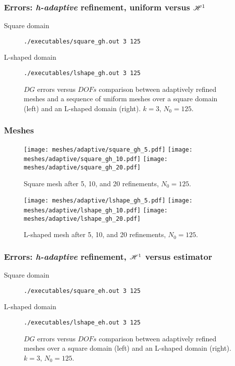 \begin{frame}[fragile]
    \frametitle{Errors: \textit{h-adaptive} refinement, uniform versus $\mathscr{H}^1$}

    \begin{description}
        \item[Square domain] \lstinline{./executables/square_gh.out 3 125}
        \item[L-shaped domain] \lstinline{./executables/lshape_gh.out 3 125}
    \end{description}

    \begin{figure}[!ht]
        
        \caption{$DG$ errors versus $DOFs$ comparison between adaptively refined meshes and a sequence of uniform meshes over a square domain (left) and an L-shaped domain (right). $k = 3$, $N_0 = 125$.}
    \end{figure}
\end{frame}

\begin{frame}
    \frametitle{Meshes}

\begin{figure}[!ht]
    \centering
    \texttt{[image: meshes/adaptive/square\_gh\_5.pdf]}
    \texttt{[image: meshes/adaptive/square\_gh\_10.pdf]}
    \texttt{[image: meshes/adaptive/square\_gh\_20.pdf]}
    \caption{Square mesh after 5, 10, and 20 refinements, $N_0 = 125$.}
\end{figure}

\begin{figure}[!ht]
    \centering
    \texttt{[image: meshes/adaptive/lshape\_gh\_5.pdf]}
    \texttt{[image: meshes/adaptive/lshape\_gh\_10.pdf]}
    \texttt{[image: meshes/adaptive/lshape\_gh\_20.pdf]}
    \caption{L-shaped mesh after 5, 10, and 20 refinements, $N_0 = 125$.}
\end{figure}
\end{frame}

\begin{frame}[fragile]
    \frametitle{Errors: \textit{h-adaptive} refinement, $\mathscr{H}^1$ versus estimator}

    \begin{description}
        \item[Square domain] \lstinline{./executables/square_eh.out 3 125}
        \item[L-shaped domain] \lstinline{./executables/lshape_eh.out 3 125}
    \end{description}

    \begin{figure}[!ht]
        
        \caption{$DG$ errors versus $DOFs$ comparison between adaptively refined meshes over a square domain (left) and an L-shaped domain (right). $k = 3$, $N_0 = 125$.}
    \end{figure}
\end{frame}

